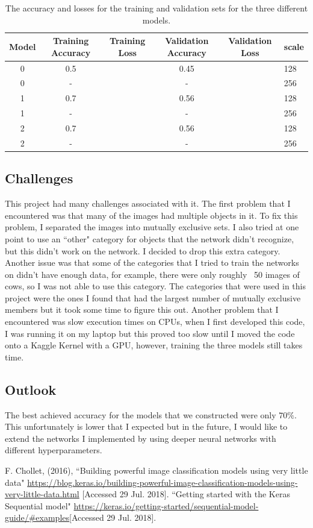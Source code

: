 \documentclass[10pt,a4paper]{article}
\begin{document}
\begin{table}[h]
\centering
\begin{tabular}{cccccl}
Model & Training Accuracy & Training Loss & Validation Accuracy  & Validation Loss & scale \\ \hline
0 & 0.5  & & 0.45 & & 128    \\
0 & -  & & - & & 256    \\
1 & 0.7  & & 0.56 & & 128   \\
1 & -  & & - & & 256    \\
2 & 0.7  & & 0.56 & & 128 \\
2 & -  & & - & & 256    \\
\end{tabular}
\caption{The accuracy and losses for the training and validation sets for the three different models.}
\end{table}


\subsection{Challenges}
This project had many challenges associated with it. The first problem that I encountered was that many of the images had multiple objects in it. To fix this problem, I separated the images into mutually exclusive sets. I also tried at one point to use an ``other" category for objects that the network didn't recognize, but this didn't work on the network. I decided to drop this extra category. Another issue was that some of the categories that I tried to train the networks on didn't have enough data, for example, there were only roughly ~50 images of cows, so I was not able to use this category. The categories that were used in this project were the ones I found that had the largest number of mutually exclusive members but it took some time to figure this out. Another problem that I encountered was slow execution times on CPUs, when I first developed this code, I was running it on my laptop but this proved too slow until I moved the code onto a Kaggle Kernel with a GPU, however, training the three models still takes time.


\newpage
\subsection{Outlook}
The best achieved accuracy for the models that we constructed were only $70 \%$. This unfortunately is lower that I expected but in the future, I would like to extend the networks I implemented by using deeper neural networks with different hyperparameters. 

\begin{thebibliography}{9}

F. Chollet, (2016), ``Building powerful image classification models using very little data" \url{https://blog.keras.io/building-powerful-image-classification-models-using-very-little-data.html} [Accessed 29 Jul. 2018].
 ``Getting started with the Keras Sequential model" \url{https://keras.io/getting-started/sequential-model-guide/#examples}[Accessed 29 Jul. 2018].


\end{thebibliography}
\end{document}
